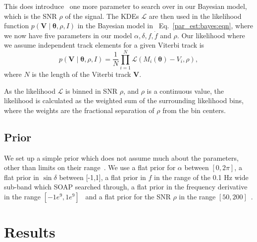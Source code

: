 This does introduce~ one more parameter to search over in our
Bayesian model, which is the \gls{SNR} $\rho$ of the signal.  The \glspl{KDE}
$\mathcal{L}$ are then used in the likelihood function $p(\bm{V} \mid
\bm{\theta}, \rho, I)$ in the Bayesian model in~
Eq.~\ref{par_est:bayes:eqn}, where we now have five parameters in our model
$\alpha, \delta, f, \dot{f}$ and $\rho$.  Our likelihood where we assume
independent track elements for a given Viterbi track is
%
\begin{equation} 
p(\bm{V} \mid \bm{\theta}, \rho, I) = \frac{1}{N}\prod_{i =
1}^{N} \mathcal{L}(M_i(\bm{\theta}) - V_i, \rho) , 
\end{equation} 
%
 where $N$ is the length of the Viterbi track $\bm{V}$.  

\if
As the likelihood $\mathcal{L}$ is binned in \gls{SNR} $\rho$, and $\rho$ is a
continuous value, the likelihood is calculated as the weighted sum of the
surrounding likelihood bins, where the weights are the fractional separation of
$\rho$ from the bin centers.  
\fi

%
\subsection{Prior}
%
We set up a simple prior which does not assume much about the parameters, other
than limits on their range~.  We use a flat prior for $\alpha$
between $[0,2\pi]$, a flat prior in $\sin{\delta}$ between [-1,1], a flat prior
in $f$ in the range of the 0.1 Hz wide sub-band which SOAP searched through, a
flat prior in the frequency derivative in the range
$[-1e^{9},1e^{9}]$~ and a flat prior for the \gls{SNR} $\rho$ in
the range $[50,200]$~.


\clearpage

\section{\label{par_est:results}Results}

